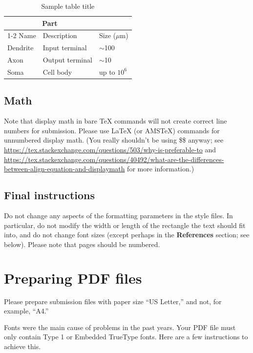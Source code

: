 \documentclass{article}
\begin{document}
\begin{table}
  \caption{Sample table title}
  \label{sample-table}
  \centering
  \begin{tabular}{lll}
    \toprule
    \multicolumn{2}{c}{Part}                   \\
    \cmidrule(r){1-2}
    Name     & Description     & Size ($\mu$m) \\
    \midrule
    Dendrite & Input terminal  & $\sim$100     \\
    Axon     & Output terminal & $\sim$10      \\
    Soma     & Cell body       & up to $10^6$  \\
    \bottomrule
  \end{tabular}
\end{table}

\subsection{Math}
Note that display math in bare TeX commands will not create correct line numbers for submission. Please use LaTeX (or AMSTeX) commands for unnumbered display math. (You really shouldn't be using \$\$ anyway; see \url{https://tex.stackexchange.com/questions/503/why-is-preferable-to} and \url{https://tex.stackexchange.com/questions/40492/what-are-the-differences-between-align-equation-and-displaymath} for more information.)

\subsection{Final instructions}

Do not change any aspects of the formatting parameters in the style files.  In
particular, do not modify the width or length of the rectangle the text should
fit into, and do not change font sizes (except perhaps in the
\textbf{References} section; see below). Please note that pages should be
numbered.


\section{Preparing PDF files}


Please prepare submission files with paper size ``US Letter,'' and not, for
example, ``A4.''


Fonts were the main cause of problems in the past years. Your PDF file must only
contain Type 1 or Embedded TrueType fonts. Here are a few instructions to
achieve this.
\end{document}
